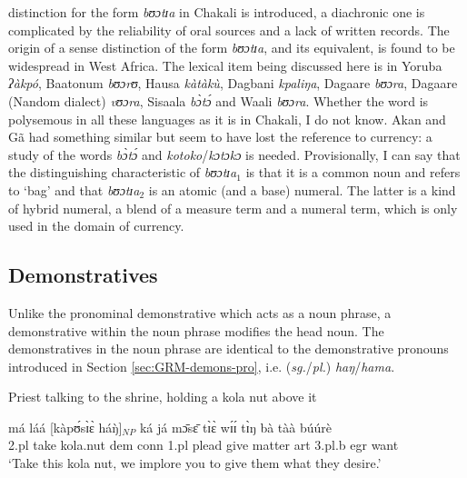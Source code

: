 \begin{exe}
\begin{exe}
\begin{exe}
{\begin{exe}
\begin{exe}
\begin{exe}
\begin{exe}
\begin{exe}
\begin{exe}
\begin{exe}
\begin{xlist}
\begin{exe}
\begin{exe}
\begin{exe}
{distinction for the form {\it bʊɔtɪa} in Chakali is introduced, a diachronic one
is complicated by the reliability of oral sources and a lack of written records.
The origin of a sense distinction of the form {\it bʊɔtɪa},  and its 
equivalent,   is found to be widespread in West Africa.  The lexical
item being discussed here is in Yoruba {\it ʔàkpó}, Baatonum {\it bʊɔrʊ}, 
Hausa
{\it kàtàkù},  Dagbani {\it kpaliŋa}, Dagaare {\it bʊɔra}, Dagaare (Nandom 
dialect)
{\it vʊɔra}, Sisaala {\it bɔ̀tɔ́} and Waali {\it bʊɔra}. Whether the word is
polysemous
in all these languages as it is in Chakali, I do not know. Akan and Gã had
something similar but seem to have lost the reference to currency: a study of
the words {\it  bɔ̀tɔ́} and {\it kotoko}/{\it kɔtɔkɔ}  is needed.} 
Provisionally, I can say that the distinguishing characteristic of {\it
bʊɔtɪa}$_{1}$ is that it is a common noun and refers to `bag' and that {\it
bʊɔtɪa}$_{2}$ is an atomic (and a base) numeral. The latter is  a kind of hybrid
 numeral, a blend of a measure term and a numeral term,   which is only used in
the domain of currency.


 
\subsection{Demonstratives}
\label{sec:GRM-demons}


Unlike the pronominal demonstrative which acts as a noun phrase, 
a demonstrative
within the noun phrase modifies the head noun. The demonstratives in the noun
phrase are identical to the demonstrative pronouns introduced in Section
\ref{sec:GRM-demons-pro}, i.e. ({\it sg.}/{\it pl.}) {\it haŋ}/{\it hama}.  



\begin{exe}
   \ex\label{ex:GRM-dem-sg}{\rm Priest talking to the shrine, holding a kola
nut above it}

\gll  má láá [kàpʊ́sɪ̀ɛ̀ háŋ̀]$_{NP}$ ká já mɔ̄sɛ̄ tɪ̀ɛ̀ wɪ́ɪ́ tɪ̀ŋ bà 
tàà búúrè\\
{\sc 2.pl} take kola.nut {\sc dem} {\sc conn} {\sc 1.pl} plead give matter {\sc
art} {\sc 3.pl.b} {\sc  egr} want\\
\glt   `Take this kola nut, we implore  you to give them what they desire.'

\z


\end{exe}
\end{exe}
\end{exe}
\end{exe}
\end{xlist}
\end{exe}
\end{exe}
\end{exe}
\end{exe}
\end{exe}
\end{exe}
\end{exe}}
\end{exe}
\end{exe}
\end{exe}
